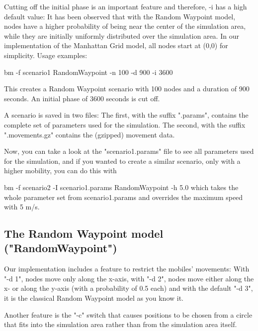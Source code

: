\documentclass[11pt,a4paper,twoside,normalheadings,headsepline,DIV13,BCOR11mm,openright]{article}
\begin{document}
Cutting off the initial phase is an important feature and therefore,  -i
has  a  high  default  value:  It has been observed that with the Random
Waypoint model, nodes have a higher probability of being near the center
of  the  simulation area, while they are initially uniformly distributed
over the simulation area. In our implementation of  the  Manhattan  Grid
model, all nodes start at (0,0) for simplicity.
\newline \newline
Usage examples:
\newline

   bm -f scenario1 RandomWaypoint -n 100 -d 900 -i 3600
\newline

This creates a Random Waypoint scenario with 100 nodes and a duration of
900 seconds. An initial phase of 3600 seconds is cut off.

A scenario is saved in two files: The first, with the suffix  ".params",
contains  the  complete  set  of parameters used for the simulation. The
second, with the suffix ".movements.gz" contains the (gzipped)  movement
data.

Now,  you  can  take  a  look  at the "scenario1.params" file to see all
parameters used for the simulation,  and  if  you  wanted  to  create  a
similar scenario, only with a higher mobility, you can do this with
\newline

   bm -f scenario2 -I scenario1.params RandomWaypoint -h 5.0 
\newline \newline
which  takes the whole parameter set from scenario1.params and overrides
the maximum speed with 5 m/s.


\subsection{The Random Waypoint model ("RandomWaypoint")}


Our  implementation  includes  a  feature  to  restrict   the   mobiles'
movements:  With  "-d 1", nodes move only along the x-axis, with "-d 2",
nodes move either along the x- or along the y-axis (with  a  probability
of  0.5  each)  and  with the default "-d 3", it is the classical Random
Waypoint model as you know it.

Another feature is the "-c" switch that causes positions  to  be  chosen
from  a  circle  that fits into the simulation area rather than from the
simulation area itself.
\end{document}
